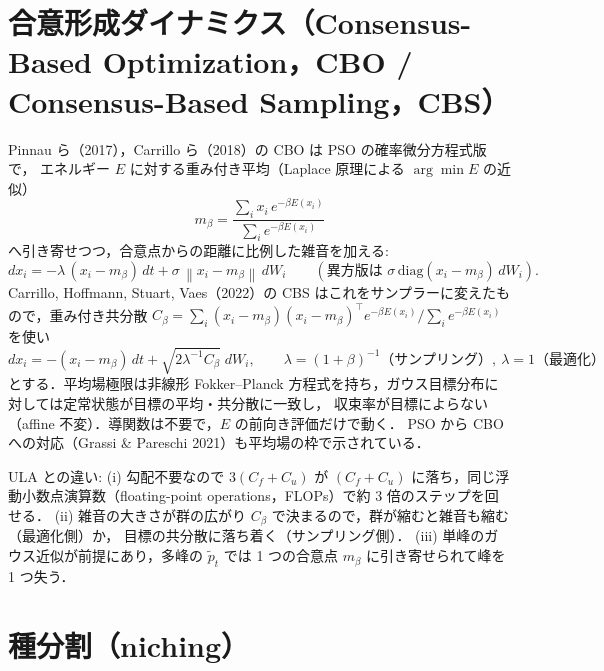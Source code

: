 \documentclass[a4paper,11pt]{article}
\newcommand{\ptil}{\tilde p_t}
\newcommand{\nrm}[1]{\left\lVert #1 \right\rVert}
\begin{document}
\section{合意形成ダイナミクス（Consensus-Based Optimization，CBO / Consensus-Based Sampling，CBS）}

Pinnau ら（2017），Carrillo ら（2018）の CBO は PSO の確率微分方程式版で，
エネルギー $E$ に対する重み付き平均（Laplace 原理による $\arg\min E$ の近似）
\begin{equation}
  m_\beta = \frac{\sum_i x_i\, e^{-\beta E(x_i)}}{\sum_i e^{-\beta E(x_i)}}
\end{equation}
へ引き寄せつつ，合意点からの距離に比例した雑音を加える:
\begin{equation}
  dx_i = -\lambda\,(x_i - m_\beta)\, dt + \sigma\, \nrm{x_i - m_\beta}\, dW_i
  \qquad(\text{異方版は } \sigma\, \mathrm{diag}(x_i - m_\beta)\, dW_i).
  \label{eq:cbo}
\end{equation}
Carrillo, Hoffmann, Stuart, Vaes（2022）の CBS はこれをサンプラーに変えたもので，重み付き共分散
$C_\beta = \sum_i (x_i - m_\beta)(x_i - m_\beta)^\top e^{-\beta E(x_i)} / \sum_i e^{-\beta E(x_i)}$ を使い
\begin{equation}
  dx_i = -(x_i - m_\beta)\, dt + \sqrt{2 \lambda^{-1} C_\beta}\; dW_i,
  \qquad \lambda = (1+\beta)^{-1} \text{（サンプリング）},\ \lambda = 1 \text{（最適化）}
  \label{eq:cbs}
\end{equation}
とする．平均場極限は非線形 Fokker--Planck 方程式を持ち，ガウス目標分布に対しては定常状態が目標の平均・共分散に一致し，
収束率が目標によらない（affine 不変）．導関数は不要で，$E$ の前向き評価だけで動く．
PSO から CBO への対応（Grassi \& Pareschi 2021）も平均場の枠で示されている．

ULA との違い: (i) 勾配不要なので $3(C_f + C_u)$ が $(C_f + C_u)$ に落ち，同じ浮動小数点演算数（floating-point operations，FLOPs）で約 3 倍のステップを回せる．
(ii) 雑音の大きさが群の広がり $C_\beta$ で決まるので，群が縮むと雑音も縮む（最適化側）か，
目標の共分散に落ち着く（サンプリング側）．
(iii) 単峰のガウス近似が前提にあり，多峰の $\ptil$ では 1 つの合意点 $m_\beta$ に引き寄せられて峰を 1 つ失う．

\section{種分割（niching）}
\end{document}
